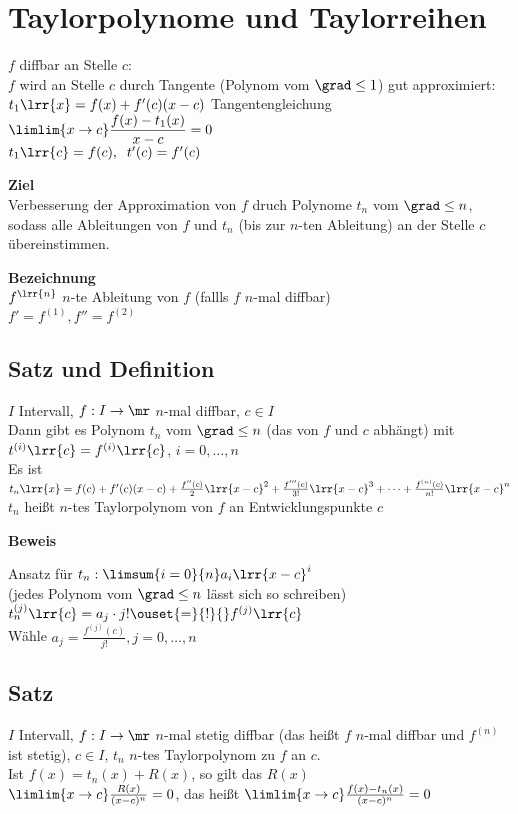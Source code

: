 \newpage
\section{Taylorpolynome und Taylorreihen}
	$f$ diffbar an Stelle $c$:\\
	$f$ wird an Stelle $c$ durch Tangente (Polynom vom $\grad\leq 1$) gut approximiert:\\
	$t_1\lrr{x}=f(x)+f'(c)(x-c)$ Tangentengleichung\\
	$\limlim{x\rightarrow c}\dfrac{f(x)-t_1(x)}{x-c}=0$\\
	$t_1\lrr{c}=f(c),\;\; t'(c)=f'(c)$
	
	\textbf{Ziel}\\
	Verbesserung der Approximation von $f$ druch Polynome $t_n$ vom $\grad\leq n$, sodass alle Ableitungen von $f$ und $t_n$ (bis zur $n$-ten Ableitung) an der Stelle $c$ übereinstimmen.
	
	\textbf{Bezeichnung}\\
	$f^{\lrr{n}}$ $n$-te Ableitung von $f$ (fallls $f$ $n$-mal diffbar)\\
	$f'=f^{(1)}, f''=f^(2)$
	
\subsection{Satz und Definition}
	$I$ Intervall, $f:I\rightarrow\mr$ $n$-mal diffbar, $c\in I$\\
	Dann gibt es Polynom $t_n$ vom $\grad\leq n$ (das von $f$ und $c$ abhängt) mit $t^{(i)}\lrr{c}=f^{(i)}\lrr{c}$, $i=0,\dots, n$\\
	Es ist $t_n\lrr{x}=f(c)+f'(c)(x-c)+\frac{f''(c)}{2}\lrr{x-c}^2+\frac{f'''(c)}{3!}\lrr{x-c}^3+\dots+\frac{f^{(n)}(c)}{n!}\lrr{x-c}^n$\\
	$t_n$ heißt $n$-tes Taylorpolynom von $f$ an Entwicklungspunkte $c$
	
	\textbf{Beweis}
	
	Ansatz für $t_n:\limsum{i=0}{n}a_i\lrr{x-c}^i$\\
	(jedes Polynom vom $\grad\leq n$ lässt sich so schreiben)\\
	$t_n^{(j)}\lrr{c}=a_j\cdot j!\ouset{=}{!}{} f^{(j)}\lrr{c}$\\
	Wähle $a_j=\frac{f^{(j)}(c)}{j!}, j=0,\dots, n$
	
\subsection{Satz}
	$I$ Intervall, $f:I\rightarrow\mr$ $n$-mal stetig diffbar (das heißt $f$ $n$-mal diffbar und $f^{(n)}$ ist stetig), $c\in I$, $t_n$ $n$-tes Taylorpolynom zu $f$ an $c$.\\
	Ist $f(x)=t_n(x)+R(x)$, so gilt das  $R(x)$\\
	$\limlim{x\rightarrow c}\frac{R(x)}{(x-c)^n}=0$, das heißt $\limlim{x\rightarrow c}\frac{f(x)-t_n(x)}{(x-c)^n}=0$
	

